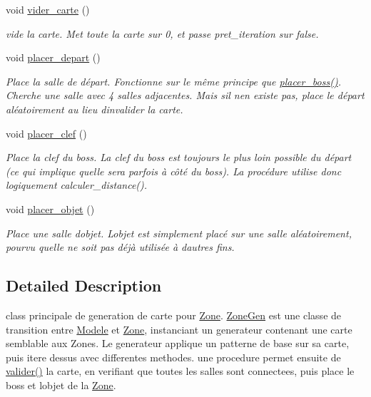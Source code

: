 \begin{DoxyCompactItemize}
void \hyperlink{classZoneGen_ab288110fafd009f569ab27d65d35b3ed}{vider\+\_\+carte} ()
\begin{DoxyCompactList}\small\item\em vide la {\itshape carte}. Met toute la {\itshape carte} sur 0, et passe {\itshape pret\+\_\+iteration} sur false. \end{DoxyCompactList}\item 
void \hyperlink{classZoneGen_aadf5a70af191ddd5f5875878831a5b63}{placer\+\_\+depart} ()
\begin{DoxyCompactList}\small\item\em Place la salle de départ. Fonctionne sur le même principe que \hyperlink{classZoneGen_a2e14ba96367ade514d250c4ae1aa5025}{placer\+\_\+boss()}. Cherche une salle avec 4 salles adjacentes. Mais s\textquotesingle{}il n\textquotesingle{}en existe pas, place le départ aléatoirement au lieu d\textquotesingle{}invalider la carte. \end{DoxyCompactList}\item 
void \hyperlink{classZoneGen_a14f00aefb1e1c0a33bddeda26c9168ca}{placer\+\_\+clef} ()
\begin{DoxyCompactList}\small\item\em Place la clef du boss. La clef du boss est toujours le plus loin possible du départ (ce qui implique qu\textquotesingle{}elle sera parfois à côté du boss). La procédure utilise donc logiquement calculer\+\_\+distance(). \end{DoxyCompactList}\item 
void \hyperlink{classZoneGen_a56263320aa237d125e4737c21a4c6fa6}{placer\+\_\+objet} ()
\begin{DoxyCompactList}\small\item\em Place une salle d\textquotesingle{}objet. L\textquotesingle{}objet est simplement placé sur une salle aléatoirement, pourvu qu\textquotesingle{}elle ne soit pas déjà utilisée à d\textquotesingle{}autres fins. \end{DoxyCompactList}\end{DoxyCompactItemize}


\subsection{Detailed Description}
class principale de generation de carte pour \hyperlink{classZone}{Zone}. \hyperlink{classZoneGen}{Zone\+Gen} est une classe de transition entre \hyperlink{classModele}{Modele} et \hyperlink{classZone}{Zone}, instanciant un generateur contenant une carte semblable aux Zones. Le generateur applique un patterne de base sur sa carte, puis \textquotesingle{}itere\textquotesingle{} dessus avec differentes methodes. une procedure permet ensuite de \hyperlink{classZoneGen_ad0f167f538f4e9f3e12908421297250f}{valider()} la carte, en verifiant que toutes les salles sont connectees, puis place le boss et l\textquotesingle{}objet de la \hyperlink{classZone}{Zone}. 

